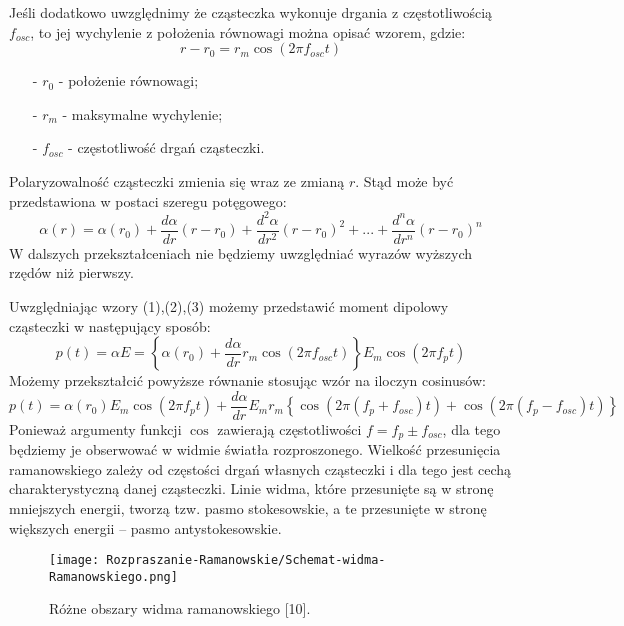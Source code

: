 Jeśli dodatkowo uwzględnimy że cząsteczka wykonuje drgania z częstotliwością $f_{osc}$, to jej wychylenie z położenia równowagi można opisać wzorem, gdzie:
\begin{equation}
	r - r_{0} = r_{m}\cos (2\pi f_{osc}t)
\end{equation}
\begin{itemize}
	\item[-]{$r_{0}$ - położenie równowagi};
	\item[-]{$r_{m}$ - maksymalne wychylenie};
	\item[-]{$f_{osc}$ - częstotliwość drgań cząsteczki}.
\end{itemize}
Polaryzowalność cząsteczki zmienia się wraz ze zmianą $r$. Stąd może być przedstawiona w postaci szeregu potęgowego:
\begin{equation}
	\alpha(r) = \alpha(r_{0}) + \frac{d\alpha}{dr}(r - r_{0}) + 
	\frac{d^{2}\alpha}{dr^{2}}(r - r_{0})^{2} + ... +
	\frac{d^{n}\alpha}{dr^{n}}(r - r_{0})^{n}
\end{equation}
W dalszych przekształceniach nie będziemy uwzględniać wyrazów wyższych rzędów niż pierwszy. 

Uwzględniając wzory (1),(2),(3) możemy przedstawić moment dipolowy cząsteczki w następujący sposób:
\begin{equation}
	p(t) = \alpha E = 
	\left\{ 
		\alpha(r_{0}) + \frac{d\alpha}{dr}r_{m}\cos (2\pi f_{osc}t) 
	\right\}
	E_{m}\cos (2\pi f_{p}t)
\end{equation}
Możemy przekształcić powyższe równanie stosując wzór na iloczyn cosinusów:
\begin{equation}
	p(t) = \alpha(r_{0})E_{m}\cos (2\pi f_{p}t) + \frac{d\alpha}{dr}E_{m}r_{m}
	\left\{
		\cos (2\pi (f_{p} + f_{osc})t) + \cos (2\pi (f_{p} - f_{osc})t)
	 \right\}
\end{equation}
Ponieważ argumenty funkcji $\cos$ zawierają częstotliwości $f = f_{p} \pm f_{osc}$, dla tego będziemy je obserwować w widmie światła
rozproszonego. Wielkość przesunięcia ramanowskiego zależy od częstości drgań własnych cząsteczki i dla tego jest cechą charakterystyczną danej cząsteczki. Linie widma, które przesunięte są w stronę mniejszych energii, tworzą tzw. pasmo stokesowskie, a te przesunięte w stronę większych energii – pasmo antystokesowskie.
\begin{figure}[H]
	\begin{center}
		\texttt{[image: Rozpraszanie-Ramanowskie/Schemat-widma-Ramanowskiego.png]}
		\caption{Różne obszary widma ramanowskiego [10].}
	\end{center}
\end{figure}

